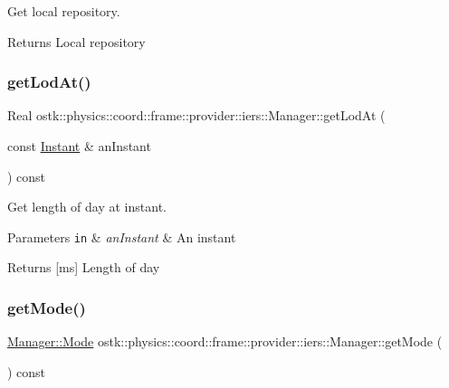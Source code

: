 Get local repository. 

\begin{DoxyReturn}{Returns}
Local repository 
\end{DoxyReturn}
\mbox{\label{classostk_1_1physics_1_1coord_1_1frame_1_1provider_1_1iers_1_1_manager_aa533ea91c79df156cd2904c63a58df34}} 
\subsubsection{\texorpdfstring{get\+Lod\+At()}{getLodAt()}}
{\footnotesize\ttfamily Real ostk\+::physics\+::coord\+::frame\+::provider\+::iers\+::\+Manager\+::get\+Lod\+At (\begin{DoxyParamCaption}\item[{const \hyperlink{classostk_1_1physics_1_1time_1_1_instant}{Instant} \&}]{an\+Instant }\end{DoxyParamCaption}) const}



Get length of day at instant. 


\begin{DoxyParams}[1]{Parameters}
\mbox{\tt in}  & {\em an\+Instant} & An instant \\
\hline
\end{DoxyParams}
\begin{DoxyReturn}{Returns}
\mbox{[}ms\mbox{]} Length of day 
\end{DoxyReturn}
\mbox{\label{classostk_1_1physics_1_1coord_1_1frame_1_1provider_1_1iers_1_1_manager_a00d80d91459b7d0fdac3c2dfed99d447}} 
\subsubsection{\texorpdfstring{get\+Mode()}{getMode()}}
{\footnotesize\ttfamily \hyperlink{classostk_1_1physics_1_1coord_1_1frame_1_1provider_1_1iers_1_1_manager_a3a8dd1081d1094069417687b4a3f16ba}{Manager\+::\+Mode} ostk\+::physics\+::coord\+::frame\+::provider\+::iers\+::\+Manager\+::get\+Mode (\begin{DoxyParamCaption}{ }\end{DoxyParamCaption}) const}



